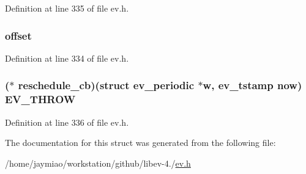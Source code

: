 \-Definition at line 335 of file ev.\-h.

\hypertarget{structev__periodic_ac00ce9c33f0c138a374ae6d957434253}{
\subsubsection[{offset}]{ {\bf offset}}}\label{structev__periodic_ac00ce9c33f0c138a374ae6d957434253}


\-Definition at line 334 of file ev.\-h.

\hypertarget{structev__periodic_a9db54a5bc43f82d7d1b46be67a2115eb}{
\subsubsection[{reschedule\-\_\-cb}]{($\ast$ {\bf reschedule\-\_\-cb})(struct {\bf ev\-\_\-periodic} $\ast$w, {\bf ev\-\_\-tstamp} now) {\bf \-E\-V\-\_\-\-T\-H\-R\-O\-W}}}\label{structev__periodic_a9db54a5bc43f82d7d1b46be67a2115eb}


\-Definition at line 336 of file ev.\-h.



\-The documentation for this struct was generated from the following file\-:\begin{DoxyCompactItemize}
\item 
/home/jaymiao/workstation/github/libev-\/4./\hyperlink{ev_8h}{ev.\-h}\end{DoxyCompactItemize}
